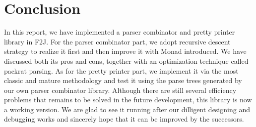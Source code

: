 \chapter{Conclusion}
In this report, we have implemented a parser combinator and pretty printer library in F2J. For the parser combinator part, we adopt recursive descent strategy to realize it first and then improve it with Monad introduced. We have discussed both its pros and cons, together with an optimization technique called packrat parsing. As for the pretty printer part, we implement it via the most classic and mature methodology and test it using the parse trees generated by our own parser combinator library. Although there are still several efficiency problems that remains to be solved in the future development, this library is now a working version. We are glad to see it running after our dilligent designing and debugging works and sincerely hope that it can be improved by the successors.